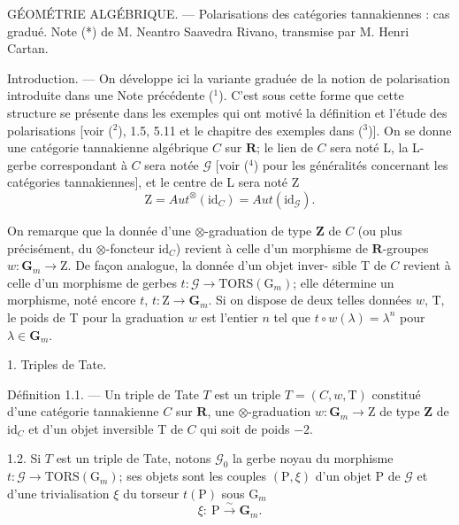 
GÉOMÉTRIE ALGÉBRIQUE. --- Polarisations des catégories tannakiennes :
cas gradué. Note (*) de M. Neantro Saavedra Rivano, transmise par
M. Henri Cartan.

Introduction. --- On développe ici la variante graduée de la notion
de polarisation introduite dans une Note précédente (${}^{1}$). C'est sous cette
forme que cette structure se présente dans les exemples qui ont motivé
la définition et l'étude des polarisations [voir (${}^{2}$), 1.5, 5.11 et le chapitre
des exemples dans (${}^{3}$)].
On se donne une catégorie tannakienne algébrique $C$ sur $\mathbf{R}$; le lien
de $C$ sera noté L, la L-gerbe correspondant à $C$ sera notée $\mathcal{G}$ [voir (${}^{4}$)
pour les généralités concernant les catégories tannakiennes], et le centre
de L sera noté Z
\[ \mathrm{Z} = \mathit{Aut}^{\otimes}(\mathrm{id}_{C}) = \mathit{Aut}(\mathrm{id}_{\mathcal{G}}). \]

On remarque que la donnée d'une $\otimes$-graduation de type $\mathbf{Z}$ de $C$ (ou plus
précisément, du $\otimes$-foncteur $\mathrm{id}_{C}$) revient à celle d'un morphisme de
$\mathbf{R}$-groupes $w : \mathbf{G}_{m} \to \mathrm{Z}$. De façon analogue, la donnée d'un objet inver-%
sible T de $C$ revient à celle d'un morphisme de gerbes $t : \mathcal{G} \to \mathrm{TORS}(\mathrm{G}_{m})$;
elle détermine un morphisme, noté encore $t$, $t : \mathrm{Z} \to \mathbf{G}_{m}$. Si on dispose
de deux telles données $w$, T, le poids de T pour la graduation $w$ est
l'entier $n$ tel que $t \circ w(\lambda) = \lambda^{n}$ pour $\lambda \in \mathbf{G}_{m}$.

1. Triples de Tate.

Définition 1.1. --- Un triple de Tate $T$ est un triple $T = (C, w, \mathrm{T})$
constitué d'une catégorie tannakienne $C$ sur $\mathbf{R}$, une $\otimes$-graduation
$w : \mathbf{G}_{m} \to \mathrm{Z}$ de type $\mathbf{Z}$ de $\mathrm{id}_{C}$ et d'un objet inversible T de $C$ qui soit
de poids $-2$.

1.2. Si $T$ est un triple de Tate, notons $\mathcal{G}_{0}$ la gerbe noyau du morphisme
$t : \mathcal{G} \to \mathrm{TORS}(\mathrm{G}_{m})$; ses objets sont les couples $(\mathrm{P}, \xi)$ d'un objet P
de $\mathcal{G}$ et d'une trivialisation $\xi$ du torseur $t(\mathrm{P})$ sous $\mathrm{G}_{m}$
\[ \xi : \ \mathrm{P} \xrightarrow{\sim} \mathbf{G}_{m}. \]

